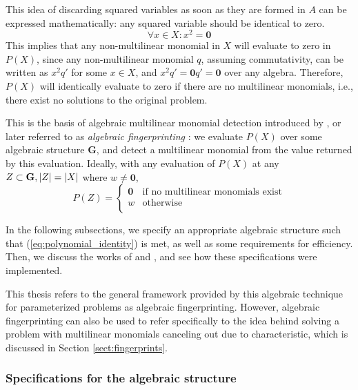This idea of discarding squared variables as soon as they are formed in $A$ 
can be expressed mathematically: any squared variable should be identical to
zero. 
\begin{equation}
  \label{eq:squared_to_zero}
\forall x \in X: x^2 = \mathbf{0}
\end{equation}
This implies that any non-multilinear monomial in $X$ will evaluate to zero in $P(X)$, since 
any non-multilinear monomial $q$, assuming commutativity, can be written as $x^2q'$ 
for some $x \in X$, and $x^2q' = \mathbf{0}q' = \mathbf{0}$ over any algebra. 
Therefore, $P(X)$ will identically evaluate to zero if there are no multilinear monomials, 
i.e., there exist no solutions to the original problem.

This is the basis of algebraic multilinear monomial detection introduced by 
\citeauthor{Koutis08} \cite{Koutis08}, 
or later referred to as \emph{algebraic fingerprinting} \cite{KouWil15}: 
we evaluate $P(X)$ over some algebraic structure $\mathbf{G}$, 
and detect a multilinear monomial from 
the value returned by this evaluation. Ideally, with any 
evaluation of $P(X)$ at any $Z \subset \mathbf{G}, {\left\vert Z\right\vert} = {\left\vert X\right\vert}$ 
where $w \neq \mathbf{0}$, 
\begin{equation}
  \label{eq:polynomial_identity}
  P(Z) =
    \begin{cases}
      \mathbf{0} & \text{if no multilinear monomials exist}\\
      w & \text{otherwise}\\
    \end{cases}       
\end{equation}

In the following subsections, we specify an appropriate algebraic structure such that 
(\ref{eq:polynomial_identity}) is met, as well as some requirements for efficiency. 
Then, we discuss the works of \citeauthor{Koutis08} 
and \citeauthor{Williams09} \cite{Koutis08, Williams09}, 
and see how these specifications were implemented.

This thesis refers to the general framework provided 
by this algebraic technique for parameterized problems \cite{KouWil09, KouWil15} as 
algebraic fingerprinting. However, algebraic fingerprinting can also 
be used to refer specifically to the idea behind solving a problem 
with multilinear monomials canceling out due to characteristic,  
which is discussed in Section \ref{sect:fingerprints}.

\subsubsection{Specifications for the algebraic structure}
\label{sect:algebra_specs}

